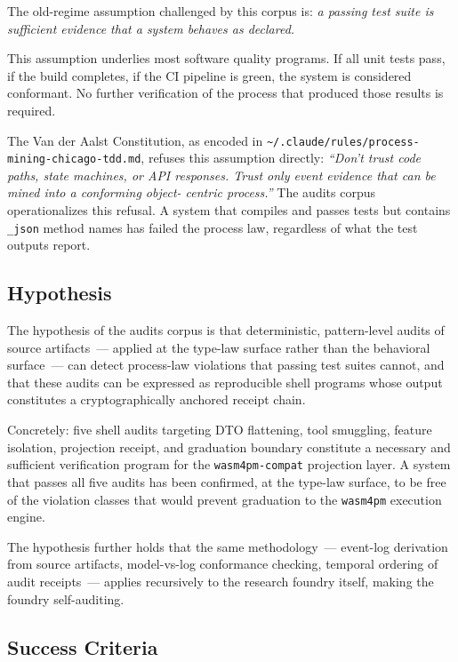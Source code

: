 The old-regime assumption challenged by this corpus is: \emph{a passing test suite
is sufficient evidence that a system behaves as declared.}

This assumption underlies most software quality programs. If all unit tests pass,
if the build completes, if the CI pipeline is green, the system is considered
conformant. No further verification of the process that produced those results is
required.

The Van der Aalst Constitution, as encoded in
\texttt{\textasciitilde/.claude/rules/process-mining-chicago-tdd.md}, refuses this
assumption directly: \emph{``Don't trust code paths, state machines, or API
responses. Trust only event evidence that can be mined into a conforming object-
centric process.''} The audits corpus operationalizes this refusal. A system that
compiles and passes tests but contains \texttt{\_json} method names has failed the
process law, regardless of what the test outputs report.

\subsection{Hypothesis}
\label{sec:audits-rq-hypothesis}

The hypothesis of the audits corpus is that deterministic, pattern-level audits of
source artifacts~--- applied at the type-law surface rather than the behavioral
surface~--- can detect process-law violations that passing test suites cannot, and
that these audits can be expressed as reproducible shell programs whose output
constitutes a cryptographically anchored receipt chain.

Concretely: five shell audits targeting DTO flattening, tool smuggling, feature
isolation, projection receipt, and graduation boundary constitute a necessary and
sufficient verification program for the \texttt{wasm4pm-compat} projection layer.
A system that passes all five audits has been confirmed, at the type-law surface,
to be free of the violation classes that would prevent graduation to the
\texttt{wasm4pm} execution engine.

The hypothesis further holds that the same methodology~--- event-log derivation
from source artifacts, model-vs-log conformance checking, temporal ordering of
audit receipts~--- applies recursively to the research foundry itself, making the
foundry self-auditing.

\subsection{Success Criteria}
\label{sec:audits-rq-success}

